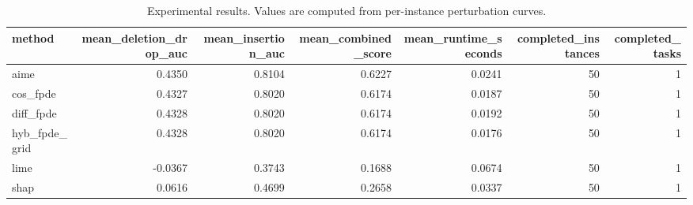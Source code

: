 \begin{table}[t]
\caption{Experimental results. Values are computed from per-instance perturbation curves.}
\label{tab:main_results_computed}
\centering
\begin{tabular}{lrrrrrr}
\toprule
method & mean\_deletion\_drop\_auc & mean\_insertion\_auc & mean\_combined\_score & mean\_runtime\_seconds & completed\_instances & completed\_tasks \\
\midrule
aime & 0.4350 & 0.8104 & 0.6227 & 0.0241 & 50 & 1 \\
cos\_fpde & 0.4327 & 0.8020 & 0.6174 & 0.0187 & 50 & 1 \\
diff\_fpde & 0.4328 & 0.8020 & 0.6174 & 0.0192 & 50 & 1 \\
hyb\_fpde\_grid & 0.4328 & 0.8020 & 0.6174 & 0.0176 & 50 & 1 \\
lime & -0.0367 & 0.3743 & 0.1688 & 0.0674 & 50 & 1 \\
shap & 0.0616 & 0.4699 & 0.2658 & 0.0337 & 50 & 1 \\
\bottomrule
\end{tabular}

\end{table}
